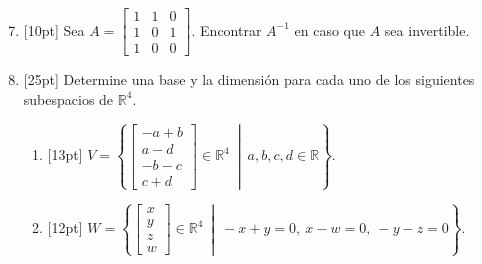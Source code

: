 \documentclass[11pt]{article}
\begin{document}
\begin{enumerate}
\setcounter{enumi}{6}
\item{}[10pt] Sea $A = \begin{bmatrix}1&1&0\\1&0&1\\1&0&0\end{bmatrix}$. Encontrar $A^{-1}$ en caso que $A$ sea invertible.

\vspace{6cm}

\newpage
\item{}[25pt] Determine una base y la dimensión para cada uno de los siguientes subespacios de $\mathbb{R}^4$.
\begin{enumerate}
\item{}[13pt] $V = \left\{\begin{bmatrix}-a+b\\a-d\\-b-c\\c+d\end{bmatrix}\in\mathbb{R}^4\ \middle|\ a,b,c,d\in\mathbb{R}\right\}$.

\vspace{6cm}

\item{}[12pt] $W = \left\{\begin{bmatrix}x\\y\\z\\w\end{bmatrix}\in\mathbb{R}^4\ \middle|\ -x+y=0,\ x-w=0,\ -y-z=0\right\}$.

\vspace{6cm}
\end{enumerate}
\end{enumerate}

\examfooter
\end{document}
